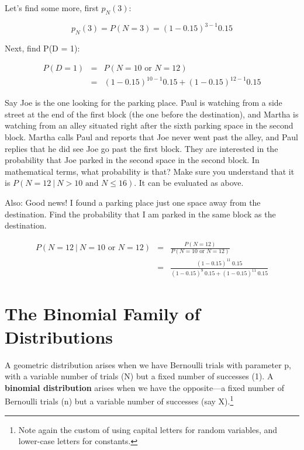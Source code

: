 Let's find some more, first $p_N(3)$:

\begin{equation}
p_N(3) = P(N = 3) = (1-0.15)^{3-1} 0.15
\end{equation}

Next, find P(D = 1):

\begin{eqnarray}
P(D = 1) &=& P(N = 10 \textrm{ or } N = 12) \\
&=& (1-0.15)^{10-1} 0.15 + (1-0.15)^{12-1} 0.15
\end{eqnarray}

Say Joe is the one looking for the parking place.  Paul is watching from
a side street at the end of the first block (the one before the
destination), and Martha is watching from an alley situated right after
the sixth parking space in the second block.  Martha calls Paul and
reports that Joe never went past the alley, and Paul replies that he did
see Joe go past the first block.  They are interested in the probability
that Joe parked in the second space in the second block.  In
mathematical terms, what probability is that?  Make sure you understand
that it is $P(N = 12 ~|~ N > 10 \textrm{ and } N \leq 16)$.  It can be
evaluated as above.

Also:  Good news!  I found a parking place just one space away from the
destination.  Find the probability that I am parked in the same block as
the destination.

\begin{eqnarray}
P(N = 12 ~|~ N = 10 \textrm{ or } N = 12) &=&
\frac{P(N = 12)}{P(N = 10 \textrm{ or } N = 12)} \\
&=& \frac
{(1-0.15)^{11} ~ 0.15}
{(1-0.15)^{9} ~ 0.15 + (1-0.15)^{11} ~ 0.15}
\end{eqnarray}

\section{The Binomial Family of Distributions}
\label{binom}

A geometric distribution arises when we have Bernoulli trials with
parameter p, with a variable number of trials (N) but a fixed number of
successes (1).  A {\bf binomial distribution} arises when we have the
opposite---a fixed number of Bernoulli trials (n) but a variable number
of successes (say X).\footnote{Note again the custom of using capital
letters for random variables, and lower-case letters for constants.}

